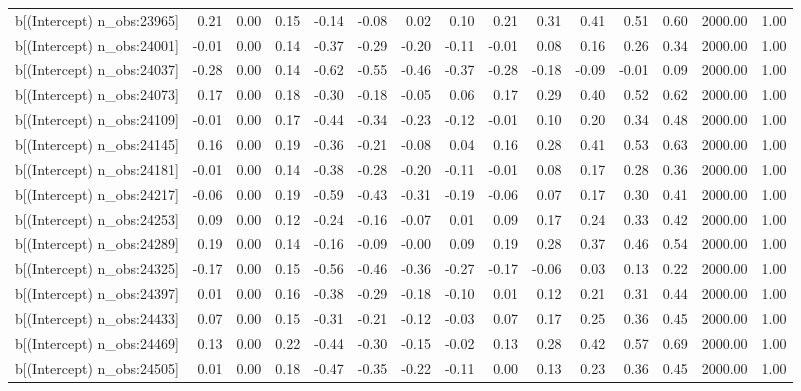 \begin{table}[ht]
\begin{tabular}{rrrrrrrrrrrrrrr}
  b[(Intercept) n\_obs:23965] & 0.21 & 0.00 & 0.15 & -0.14 & -0.08 & 0.02 & 0.10 & 0.21 & 0.31 & 0.41 & 0.51 & 0.60 & 2000.00 & 1.00 \\ 
  b[(Intercept) n\_obs:24001] & -0.01 & 0.00 & 0.14 & -0.37 & -0.29 & -0.20 & -0.11 & -0.01 & 0.08 & 0.16 & 0.26 & 0.34 & 2000.00 & 1.00 \\ 
  b[(Intercept) n\_obs:24037] & -0.28 & 0.00 & 0.14 & -0.62 & -0.55 & -0.46 & -0.37 & -0.28 & -0.18 & -0.09 & -0.01 & 0.09 & 2000.00 & 1.00 \\ 
  b[(Intercept) n\_obs:24073] & 0.17 & 0.00 & 0.18 & -0.30 & -0.18 & -0.05 & 0.06 & 0.17 & 0.29 & 0.40 & 0.52 & 0.62 & 2000.00 & 1.00 \\ 
  b[(Intercept) n\_obs:24109] & -0.01 & 0.00 & 0.17 & -0.44 & -0.34 & -0.23 & -0.12 & -0.01 & 0.10 & 0.20 & 0.34 & 0.48 & 2000.00 & 1.00 \\ 
  b[(Intercept) n\_obs:24145] & 0.16 & 0.00 & 0.19 & -0.36 & -0.21 & -0.08 & 0.04 & 0.16 & 0.28 & 0.41 & 0.53 & 0.63 & 2000.00 & 1.00 \\ 
  b[(Intercept) n\_obs:24181] & -0.01 & 0.00 & 0.14 & -0.38 & -0.28 & -0.20 & -0.11 & -0.01 & 0.08 & 0.17 & 0.28 & 0.36 & 2000.00 & 1.00 \\ 
  b[(Intercept) n\_obs:24217] & -0.06 & 0.00 & 0.19 & -0.59 & -0.43 & -0.31 & -0.19 & -0.06 & 0.07 & 0.17 & 0.30 & 0.41 & 2000.00 & 1.00 \\ 
  b[(Intercept) n\_obs:24253] & 0.09 & 0.00 & 0.12 & -0.24 & -0.16 & -0.07 & 0.01 & 0.09 & 0.17 & 0.24 & 0.33 & 0.42 & 2000.00 & 1.00 \\ 
  b[(Intercept) n\_obs:24289] & 0.19 & 0.00 & 0.14 & -0.16 & -0.09 & -0.00 & 0.09 & 0.19 & 0.28 & 0.37 & 0.46 & 0.54 & 2000.00 & 1.00 \\ 
  b[(Intercept) n\_obs:24325] & -0.17 & 0.00 & 0.15 & -0.56 & -0.46 & -0.36 & -0.27 & -0.17 & -0.06 & 0.03 & 0.13 & 0.22 & 2000.00 & 1.00 \\ 
  b[(Intercept) n\_obs:24397] & 0.01 & 0.00 & 0.16 & -0.38 & -0.29 & -0.18 & -0.10 & 0.01 & 0.12 & 0.21 & 0.31 & 0.44 & 2000.00 & 1.00 \\ 
  b[(Intercept) n\_obs:24433] & 0.07 & 0.00 & 0.15 & -0.31 & -0.21 & -0.12 & -0.03 & 0.07 & 0.17 & 0.25 & 0.36 & 0.45 & 2000.00 & 1.00 \\ 
  b[(Intercept) n\_obs:24469] & 0.13 & 0.00 & 0.22 & -0.44 & -0.30 & -0.15 & -0.02 & 0.13 & 0.28 & 0.42 & 0.57 & 0.69 & 2000.00 & 1.00 \\ 
  b[(Intercept) n\_obs:24505] & 0.01 & 0.00 & 0.18 & -0.47 & -0.35 & -0.22 & -0.11 & 0.00 & 0.13 & 0.23 & 0.36 & 0.45 & 2000.00 & 1.00 \\ 

\end{tabular}
\end{table}
